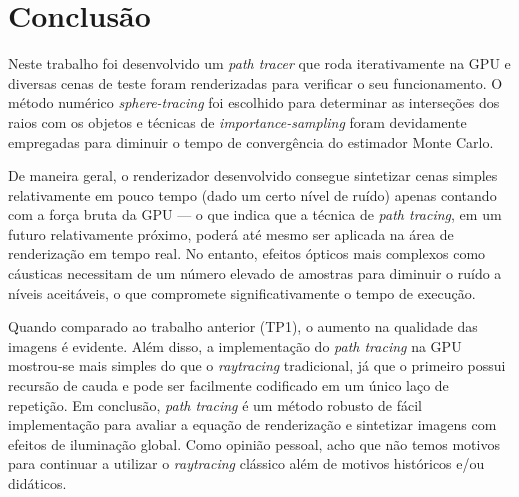 \documentclass[11pt,a4paper]{article}
\begin{document}
\section{Conclusão}
Neste trabalho foi desenvolvido um \textit{path tracer} que roda iterativamente na GPU e diversas cenas de teste foram renderizadas para verificar o seu funcionamento. O método numérico \textit{sphere-tracing} foi escolhido para determinar as interseções dos raios com os objetos e técnicas de \textit{importance-sampling} foram devidamente empregadas para diminuir o tempo de convergência do estimador Monte Carlo.

De maneira geral, o renderizador desenvolvido consegue sintetizar cenas simples relativamente em pouco tempo (dado um certo nível de ruído) apenas contando com a força bruta da GPU --- o que indica que a técnica de \textit{path tracing}, em um futuro relativamente próximo, poderá até mesmo ser aplicada na área de renderização em tempo real. No entanto, efeitos ópticos mais complexos como cáusticas necessitam de um número elevado de amostras para diminuir o ruído a níveis aceitáveis, o que compromete significativamente o tempo de execução.

Quando comparado ao trabalho anterior (TP1), o aumento na qualidade das imagens é evidente. Além disso, a implementação do \textit{path tracing} na GPU mostrou-se mais simples do que o \textit{raytracing} tradicional, já que o primeiro possui recursão de cauda e pode ser facilmente codificado em um único laço de repetição. Em conclusão, \textit{path tracing} é um método robusto de fácil implementação para avaliar a equação de renderização e sintetizar imagens com efeitos de iluminação global. Como opinião pessoal, acho que não temos motivos para continuar a utilizar o \textit{raytracing} clássico além de motivos históricos e/ou didáticos.



\end{document}
